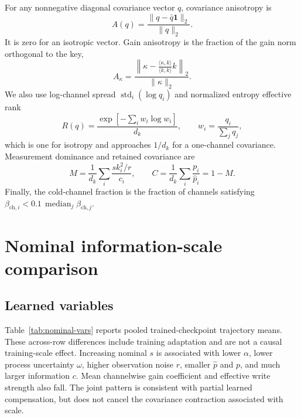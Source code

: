 \documentclass[11pt]{article}
\newcommand{\Akap}{A_{\kappa}}
\newcommand{\Mdom}{M}
\newcommand{\Cret}{C}
\begin{document}
For any nonnegative diagonal covariance vector $q$, covariance anisotropy is
\begin{equation}
  A(q)=\frac{\lVert q-\bar q\mathbf 1\rVert_2}{\lVert q\rVert_2}.
\end{equation}
It is zero for an isotropic vector.  Gain anisotropy is the fraction of the gain norm
orthogonal to the key,
\begin{equation}
  \Akap=
  \frac{\left\lVert\kappa-
  \frac{\langle\kappa,k\rangle}{\langle k,k\rangle}k\right\rVert_2}
  {\lVert\kappa\rVert_2}.
\end{equation}
We also use log-channel spread
$\operatorname{std}_i(\log q_i)$ and normalized entropy effective rank
\begin{equation}
  R(q)=\frac{\exp\!\left[-\sum_i w_i\log w_i\right]}{d_k},
  \qquad w_i=\frac{q_i}{\sum_j q_j},
\end{equation}
which is one for isotropy and approaches $1/d_k$ for a one-channel covariance.
Measurement dominance and retained covariance are
\begin{equation}
  \Mdom=\frac{1}{d_k}\sum_i\frac{s k_i^2/r}{c_i},
  \qquad
  \Cret=\frac{1}{d_k}\sum_i\frac{p_i}{\widehat p_i}=1-\Mdom.
\end{equation}
Finally, the cold-channel fraction is the fraction of channels satisfying
$\beta_{\mathrm{ch},i}<0.1\,\operatorname{median}_j\beta_{\mathrm{ch},j}$.

\section{Nominal information-scale comparison}

\subsection{Learned variables}

Table~\ref{tab:nominal-vars} reports pooled trained-checkpoint trajectory means.  These
across-row differences include training adaptation and are not a causal training-scale
effect.  Increasing nominal $s$ is associated with lower $\alpha$, lower process uncertainty
$\omega$, higher observation noise $r$, smaller $\widehat p$ and $p$, and much larger
information $c$.  Mean channelwise gain coefficient and effective write strength also fall.
The joint pattern is consistent with partial learned compensation, but does not cancel the
covariance contraction associated with scale.
\end{document}
